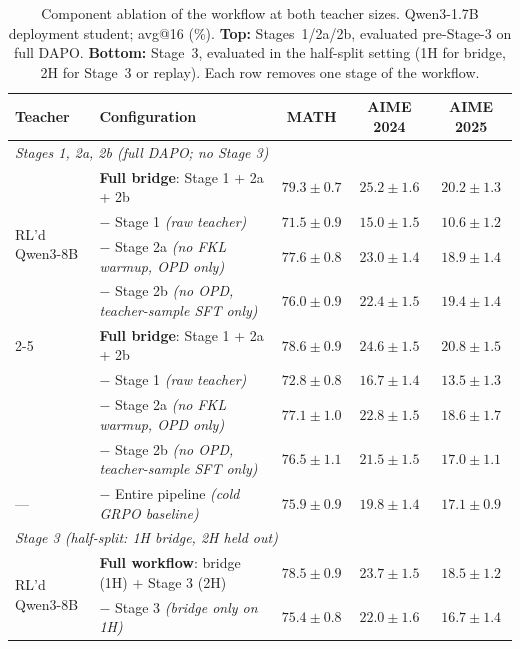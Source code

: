 \documentclass{article}
\begin{document}
\begin{table}[t]
\caption{Component ablation of the workflow at both teacher sizes. Qwen3-1.7B deployment student; avg@16 (\%). \textbf{Top:} Stages~1/2a/2b, evaluated pre-Stage-3 on full DAPO. \textbf{Bottom:} Stage~3, evaluated in the half-split setting (1H for bridge, 2H for Stage~3 or replay). Each row removes one stage of the workflow.}
\label{tab:component-ablation}
\centering
\small
\begin{tabular}{@{}llccc@{}}
\toprule
Teacher & Configuration & MATH & AIME 2024 & AIME 2025 \\
\midrule
\multicolumn{5}{l}{\emph{Stages 1, 2a, 2b (full DAPO; no Stage 3)}} \\
\midrule
\multirow{4}{*}{RL'd Qwen3-8B}
  & \textbf{Full bridge}: Stage 1 + 2a + 2b               & $\mathbf{79.3 \pm 0.7}$ & $\mathbf{25.2 \pm 1.6}$ & $20.2 \pm 1.3$ \\
  & $-$ Stage 1 \emph{(raw teacher)}                      & $71.5 \pm 0.9$ & $15.0 \pm 1.5$ & $10.6 \pm 1.2$ \\
  & $-$ Stage 2a \emph{(no FKL warmup, OPD only)}         & $77.6 \pm 0.8$ & $23.0 \pm 1.4$ & $18.9 \pm 1.4$ \\
  & $-$ Stage 2b \emph{(no OPD, teacher-sample SFT only)} & $76.0 \pm 0.9$ & $22.4 \pm 1.5$ & $19.4 \pm 1.4$ \\
\cmidrule(lr){2-5}
\multirow{4}{*}{RL'd Qwen3-14B}
  & \textbf{Full bridge}: Stage 1 + 2a + 2b               & $78.6 \pm 0.9$ & $24.6 \pm 1.5$ & $\mathbf{20.8 \pm 1.5}$ \\
  & $-$ Stage 1 \emph{(raw teacher)}                      & $72.8 \pm 0.8$ & $16.7 \pm 1.4$ & $13.5 \pm 1.3$ \\
  & $-$ Stage 2a \emph{(no FKL warmup, OPD only)}         & $77.1 \pm 1.0$ & $22.8 \pm 1.5$ & $18.6 \pm 1.7$ \\
  & $-$ Stage 2b \emph{(no OPD, teacher-sample SFT only)} & $76.5 \pm 1.1$ & $21.5 \pm 1.5$ & $17.0 \pm 1.1$ \\
\midrule
--- & $-$ Entire pipeline \emph{(cold GRPO baseline)}     & $75.9 \pm 0.9$ & $19.8 \pm 1.4$ & $17.1 \pm 0.9$ \\
\midrule
\multicolumn{5}{l}{\emph{Stage 3 (half-split: 1H bridge, 2H held out)}} \\
\midrule
\multirow{3}{*}{RL'd Qwen3-8B}
  & \textbf{Full workflow}: bridge (1H) + Stage 3 (2H)    & $\mathbf{78.5 \pm 0.9}$ & $\mathbf{23.7 \pm 1.5}$ & $18.5 \pm 1.2$ \\
  & $-$ Stage 3 \emph{(bridge only on 1H)}                & $75.4 \pm 0.8$ & $22.0 \pm 1.6$ & $16.7 \pm 1.4$ \\

\end{tabular}
\end{table}
\end{document}
